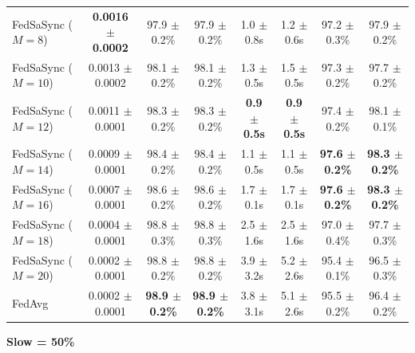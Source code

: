 \begin{table}[t]
{\begin{tabular}{lccccccc}
\hline
FedSaSync ($M = 8$) & \textbf{0.0016 $\pm$ 0.0002} & 97.9 $\pm$ 0.2\% & 97.9 $\pm$ 0.2\% & 1.0 $\pm$ 0.8s & 1.2 $\pm$ 0.6s & 97.2 $\pm$ 0.3\% & 97.9 $\pm$ 0.2\% \\
FedSaSync ($M = 10$) & 0.0013 $\pm$ 0.0002 & 98.1 $\pm$ 0.2\% & 98.1 $\pm$ 0.2\% & 1.3 $\pm$ 0.5s & 1.5 $\pm$ 0.5s & 97.3 $\pm$ 0.2\% & 97.7 $\pm$ 0.2\% \\
FedSaSync ($M = 12$) & 0.0011 $\pm$ 0.0001 & 98.3 $\pm$ 0.2\% & 98.3 $\pm$ 0.2\% & \textbf{0.9 $\pm$ 0.5s} & \textbf{0.9 $\pm$ 0.5s} & 97.4 $\pm$ 0.2\% & 98.1 $\pm$ 0.1\% \\
FedSaSync ($M = 14$) & 0.0009 $\pm$ 0.0001 & 98.4 $\pm$ 0.2\% & 98.4 $\pm$ 0.2\% & 1.1 $\pm$ 0.5s & 1.1 $\pm$ 0.5s & \textbf{97.6 $\pm$ 0.2\%} & \textbf{98.3 $\pm$ 0.2\%} \\
FedSaSync ($M = 16$) & 0.0007 $\pm$ 0.0001 & 98.6 $\pm$ 0.2\% & 98.6 $\pm$ 0.2\% & 1.7 $\pm$ 0.1s & 1.7 $\pm$ 0.1s & \textbf{97.6 $\pm$ 0.2\%} & \textbf{98.3 $\pm$ 0.2\%} \\
FedSaSync ($M = 18$) & 0.0004 $\pm$ 0.0001 & 98.8 $\pm$ 0.3\% & 98.8 $\pm$ 0.3\% & 2.5 $\pm$ 1.6s & 2.5 $\pm$ 1.6s & 97.0 $\pm$ 0.4\% & 97.7 $\pm$ 0.3\% \\
FedSaSync ($M = 20$) & 0.0002 $\pm$ 0.0001 & 98.8 $\pm$ 0.2\% & 98.8 $\pm$ 0.2\% & 3.9 $\pm$ 3.2s & 5.2 $\pm$ 2.6s & 95.4 $\pm$ 0.1\% & 96.5 $\pm$ 0.3\% \\
FedAvg & 0.0002 $\pm$ 0.0001 & \textbf{98.9 $\pm$ 0.2\%} & \textbf{98.9 $\pm$ 0.2\%} & 3.8 $\pm$ 3.1s & 5.1 $\pm$ 2.6s & 95.5 $\pm$ 0.2\% & 96.4 $\pm$ 0.2\% \\
\hline
\end{tabular}%
}
\par\vspace{0.8em}
\noindent\textbf{Slow = 50\%} \\[0.2em]
\end{table}
